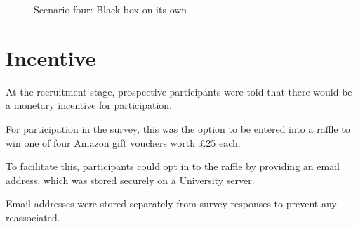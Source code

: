 \documentclass[manuscript,screen,review]{acmart}
\begin{document}
\begin{figure}[H]
    \caption{Scenario four: Black box on its own}
    \label{fig:questionnaire-scenario-4}
\end{figure}

\section{Incentive}  


At the recruitment stage, prospective participants were told that there would be a monetary incentive for participation.

For participation in the survey, this was the option to be entered into a raffle to win one of four Amazon gift vouchers worth £25 each.

To facilitate this, participants could opt in to the raffle by providing an email address, which was stored securely on a University server. 

Email addresses were stored separately from survey responses to prevent any reassociated. 
\end{document}
